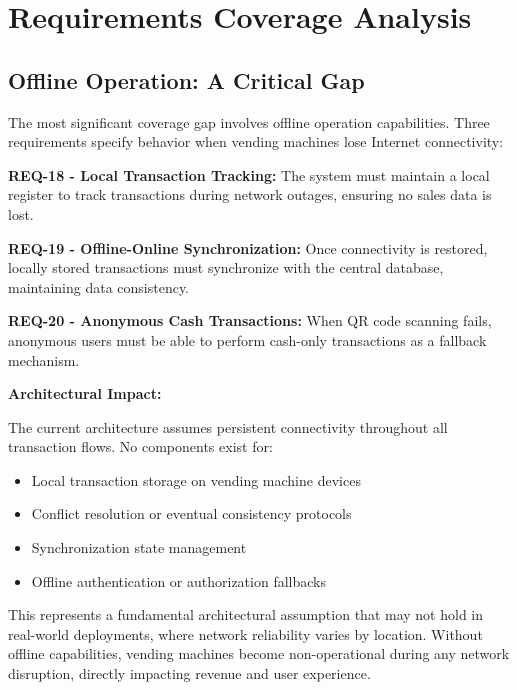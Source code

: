 \documentclass[11pt,a4paper]{article}
\begin{document}
\section{Requirements Coverage Analysis}

\subsection{Offline Operation: A Critical Gap}
\label{sec:offline-gap}

The most significant coverage gap involves offline operation capabilities. Three requirements specify behavior when vending machines lose Internet connectivity:

\begin{tcolorbox}[colback=criticalred!5,colframe=criticalred,title=\textbf{Unsupported Offline Requirements}]
\textbf{\label{req:offline-tracking}REQ-18 - Local Transaction Tracking:} The system must maintain a local register to track transactions during network outages, ensuring no sales data is lost.

\textbf{\label{req:offline-sync}REQ-19 - Offline-Online Synchronization:} Once connectivity is restored, locally stored transactions must synchronize with the central database, maintaining data consistency.

\textbf{\label{req:offline-cash}REQ-20 - Anonymous Cash Transactions:} When QR code scanning fails, anonymous users must be able to perform cash-only transactions as a fallback mechanism.
\end{tcolorbox}

\textbf{Architectural Impact:}

The current architecture assumes persistent connectivity throughout all transaction flows. No components exist for:
\begin{itemize}
    \item Local transaction storage on vending machine devices
    \item Conflict resolution or eventual consistency protocols
    \item Synchronization state management
    \item Offline authentication or authorization fallbacks
\end{itemize}

This represents a fundamental architectural assumption that may not hold in real-world deployments, where network reliability varies by location. Without offline capabilities, vending machines become non-operational during any network disruption, directly impacting revenue and user experience.
\end{document}
